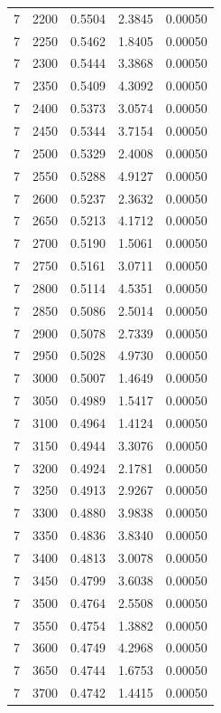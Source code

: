 \begin{longtable}{ccccc}
    7 & 2200 & 0.5504 & 2.3845 & 0.00050 \\
    7 & 2250 & 0.5462 & 1.8405 & 0.00050 \\
    7 & 2300 & 0.5444 & 3.3868 & 0.00050 \\
    7 & 2350 & 0.5409 & 4.3092 & 0.00050 \\
    7 & 2400 & 0.5373 & 3.0574 & 0.00050 \\
    7 & 2450 & 0.5344 & 3.7154 & 0.00050 \\
    7 & 2500 & 0.5329 & 2.4008 & 0.00050 \\
    7 & 2550 & 0.5288 & 4.9127 & 0.00050 \\
    7 & 2600 & 0.5237 & 2.3632 & 0.00050 \\
    7 & 2650 & 0.5213 & 4.1712 & 0.00050 \\
    7 & 2700 & 0.5190 & 1.5061 & 0.00050 \\
    7 & 2750 & 0.5161 & 3.0711 & 0.00050 \\
    7 & 2800 & 0.5114 & 4.5351 & 0.00050 \\
    7 & 2850 & 0.5086 & 2.5014 & 0.00050 \\
    7 & 2900 & 0.5078 & 2.7339 & 0.00050 \\
    7 & 2950 & 0.5028 & 4.9730 & 0.00050 \\
    7 & 3000 & 0.5007 & 1.4649 & 0.00050 \\
    7 & 3050 & 0.4989 & 1.5417 & 0.00050 \\
    7 & 3100 & 0.4964 & 1.4124 & 0.00050 \\
    7 & 3150 & 0.4944 & 3.3076 & 0.00050 \\
    7 & 3200 & 0.4924 & 2.1781 & 0.00050 \\
    7 & 3250 & 0.4913 & 2.9267 & 0.00050 \\
    7 & 3300 & 0.4880 & 3.9838 & 0.00050 \\
    7 & 3350 & 0.4836 & 3.8340 & 0.00050 \\
    7 & 3400 & 0.4813 & 3.0078 & 0.00050 \\
    7 & 3450 & 0.4799 & 3.6038 & 0.00050 \\
    7 & 3500 & 0.4764 & 2.5508 & 0.00050 \\
    7 & 3550 & 0.4754 & 1.3882 & 0.00050 \\
    7 & 3600 & 0.4749 & 4.2968 & 0.00050 \\
    7 & 3650 & 0.4744 & 1.6753 & 0.00050 \\
    7 & 3700 & 0.4742 & 1.4415 & 0.00050 \\

\end{longtable}
